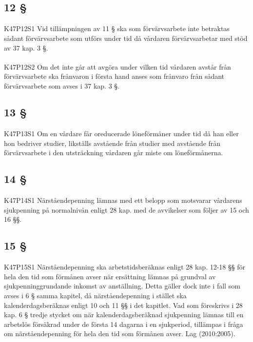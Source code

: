 \documentclass[a4paper,notitlepage,openany,10pt]{book}
\begin{document}
\subsection*{12 §}
\paragraph*{}
{\tiny K47P12S1}
Vid tillämpningen av 11 § ska som förvärvsarbete inte betraktas sådant förvärvsarbete som utförs under tid då vårdaren förvärvsarbetar med stöd av 37 kap. 3 §.
\paragraph*{}
{\tiny K47P12S2}
Om det inte går att avgöra under vilken tid vårdaren avstår från förvärvsarbete ska frånvaron i första hand anses som frånvaro från sådant förvärvsarbete som avses i 37 kap. 3 §.
\subsection*{13 §}
\paragraph*{}
{\tiny K47P13S1}
Om en vårdare får oreducerade löneförmåner under tid då han eller hon bedriver studier, likställs avstående från studier med avstående från förvärvsarbete i den utsträckning vårdaren går miste om löneförmånerna.
\subsection*{14 §}
\paragraph*{}
{\tiny K47P14S1}
Närståendepenning lämnas med ett belopp som motsvarar vårdarens sjukpenning på normalnivån enligt 28 kap. med de avvikelser som följer av 15 och 16 §§.
\subsection*{15 §}
\paragraph*{}
{\tiny K47P15S1}
Närståendepenning ska arbetstidsberäknas enligt 28 kap. 12-18 §§ för hela den tid som förmånen avser när ersättning lämnas på grundval av sjukpenninggrundande inkomst av anställning. Detta gäller dock inte i fall som avses i 6 § samma kapitel, då närståendepenning i stället ska kalenderdagsberäknas enligt 10 och 11 §§ i det kapitlet. Vad som föreskrivs i 28 kap. 6 § tredje stycket om när kalenderdagsberäknad sjukpenning lämnas till en arbetslös försäkrad under de första 14 dagarna i en sjukperiod, tillämpas i fråga om närståendepenning för hela den tid som förmånen avser.
Lag (2010:2005).
\end{document}
